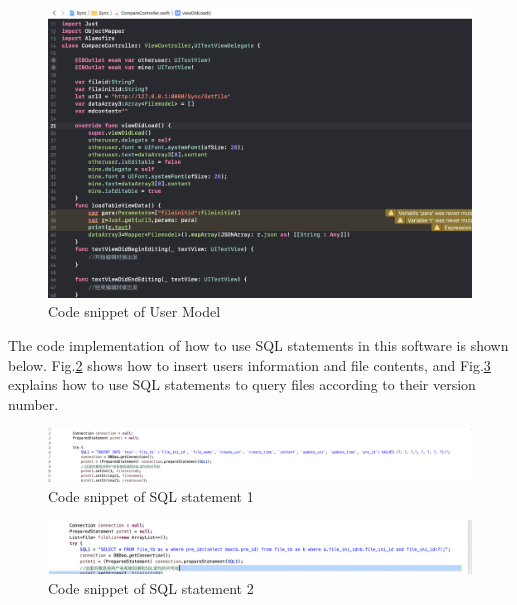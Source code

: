 \begin{figure}[H]
  \centering
  \includegraphics[width=.8\textwidth]{view.png}%
  \caption{Code snippet of User Model} %
  \label{brian} %
\end{figure}

\vspace{0.3cm}
\noindent The code implementation of how to use SQL statements in this software is shown below. Fig.\ref{brian2} shows how to insert users information and file contents, and Fig.\ref{brian3} explains how to use SQL statements to query files according to their version number.

\begin{figure}[H]
  \centering
  \includegraphics[width=.8\textwidth]{sql1.png}%
  \caption{Code snippet of SQL statement 1} %
  \label{brian2} %
\end{figure}



\begin{figure}[H]
  \centering
  \includegraphics[width=.8\textwidth]{sql2.png}%
  \caption{Code snippet of SQL statement 2} %
  \label{brian3} %
\end{figure}